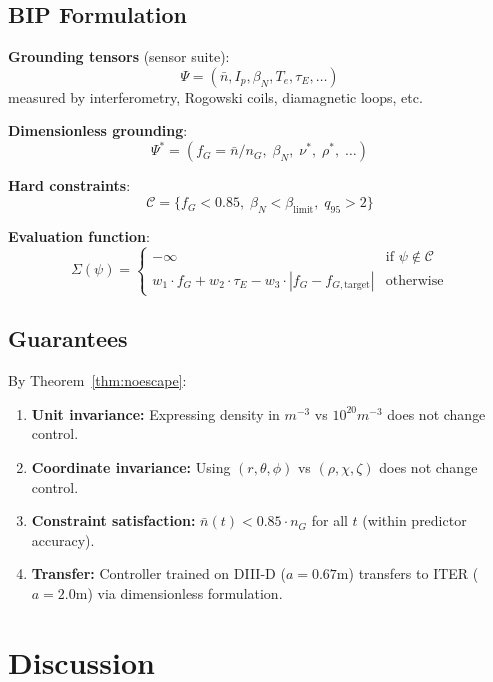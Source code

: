 \documentclass[11pt]{article}
\begin{document}
\subsection{BIP Formulation}

\textbf{Grounding tensors} (sensor suite):
\[
\Psi = (\bar{n}, I_p, \beta_N, T_e, \tau_E, \ldots)
\]
measured by interferometry, Rogowski coils, diamagnetic loops, etc.

\textbf{Dimensionless grounding}:
\[
\Psi^* = (f_G = \bar{n}/n_G,\; \beta_N,\; \nu^*,\; \rho^*,\; \ldots)
\]

\textbf{Hard constraints}:
\[
\mathcal{C} = \{f_G < 0.85,\; \beta_N < \beta_{\mathrm{limit}},\; q_{95} > 2\}
\]

\textbf{Evaluation function}:
\[
\Sigma(\psi) = \begin{cases}
-\infty & \text{if } \psi \notin \mathcal{C} \\
w_1 \cdot f_G + w_2 \cdot \tau_E - w_3 \cdot |f_G - f_{G,\mathrm{target}}| & \text{otherwise}
\end{cases}
\]

\subsection{Guarantees}

By Theorem~\ref{thm:noescape}:

\begin{enumerate}
    \item \textbf{Unit invariance:} Expressing density in $m^{-3}$ vs $10^{20}m^{-3}$ does not change control.

    \item \textbf{Coordinate invariance:} Using $(r, \theta, \phi)$ vs $(\rho, \chi, \zeta)$ does not change control.

    \item \textbf{Constraint satisfaction:} $\bar{n}(t) < 0.85 \cdot n_G$ for all $t$ (within predictor accuracy).

    \item \textbf{Transfer:} Controller trained on DIII-D ($a = 0.67$m) transfers to ITER ($a = 2.0$m) via
    dimensionless formulation.
\end{enumerate}

\section{Discussion}
\end{document}
